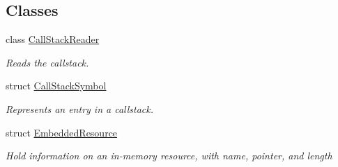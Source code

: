 \subsection*{Classes}
\begin{DoxyCompactItemize}
\item 
class \hyperlink{classdg_1_1deepcore_1_1_call_stack_reader}{Call\+Stack\+Reader}
\begin{DoxyCompactList}\small\item\em Reads the callstack. \end{DoxyCompactList}\item 
struct \hyperlink{structdg_1_1deepcore_1_1_call_stack_symbol}{Call\+Stack\+Symbol}
\begin{DoxyCompactList}\small\item\em Represents an entry in a callstack. \end{DoxyCompactList}\item 
struct \hyperlink{structdg_1_1deepcore_1_1_embedded_resource}{Embedded\+Resource}
\begin{DoxyCompactList}\small\item\em Hold information on an in-\/memory resource, with name, pointer, and length


\end{DoxyCompactList}
\end{DoxyCompactItemize}
